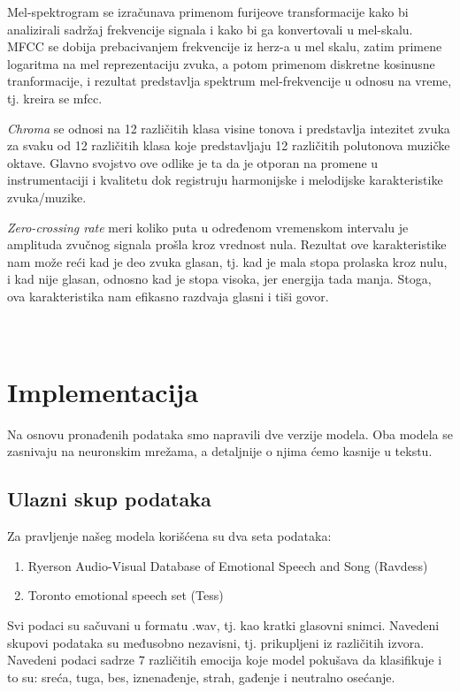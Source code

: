 \documentclass{article}
\begin{document}
Mel-spektrogram se izračunava primenom furijeove transformacije kako bi analizirali sadržaj frekvencije signala i kako bi ga konvertovali u mel-skalu.
MFCC se dobija prebacivanjem frekvencije iz herz-a u mel skalu, zatim primene logaritma na mel reprezentaciju zvuka, a potom primenom diskretne kosinusne tranformacije, i rezultat predstavlja spektrum mel-frekvencije u odnosu na vreme, tj. kreira se mfcc.


\textit{Chroma} se odnosi na 12 različitih klasa visine tonova i predstavlja intezitet zvuka za svaku od 12 različitih klasa koje predstavljaju 12 različitih polutonova muzičke oktave. Glavno svojstvo ove odlike je ta da je otporan na promene u instrumentaciji i kvalitetu dok registruju harmonijske i melodijske karakteristike zvuka/muzike.

\textit{Zero-crossing rate} meri koliko puta u određenom vremenskom intervalu je amplituda zvučnog signala prošla kroz vrednost nula. Rezultat ove karakteristike nam može reći kad je deo zvuka glasan, tj. kad je mala stopa prolaska kroz nulu, i kad nije glasan, odnosno kad je stopa visoka, jer energija tada manja. Stoga, ova karakteristika nam efikasno razdvaja glasni i tiši govor.
\\
\\
\\
\section{Implementacija}
Na osnovu pronađenih podataka smo napravili dve verzije modela. Oba modela se zasnivaju na neuronskim mrežama, a detaljnije o njima ćemo kasnije u tekstu. 

\subsection{Ulazni skup podataka}
Za pravljenje našeg modela korišćena su dva seta podataka: 
    \begin{enumerate}
    \item Ryerson Audio-Visual Database of Emotional Speech and Song (Ravdess)
    \item Toronto emotional speech set (Tess)
    \end{enumerate}
\newline
Svi podaci su sačuvani u formatu .wav, tj. kao kratki glasovni snimci. Navedeni skupovi podataka su međusobno nezavisni, tj. prikupljeni iz različitih izvora. Navedeni podaci sadrze 7 različitih emocija koje model pokušava da klasifikuje i to su: sreća, tuga, bes, iznenađenje, strah, gađenje i neutralno osećanje. 
\end{document}
